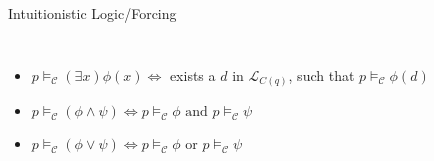 \documentclass{beamer}
\begin{document}
\begin{frame}{Intuitionistic Logic/Forcing}
\begin{columns}
{\begin{itemize}
\item    \textcolor{black!30}{$ p \vDash_{\mathcal{C}} (\exists x) \phi(x)  \Leftrightarrow $  exists a $d$ in  $\mathcal{L}_{C(q)}$, such that $p \vDash_{\mathcal{C}} \phi(d)$}\\

\item    \textcolor{black!30}{$ p \vDash_{\mathcal{C}} (\phi \land \psi)    \Leftrightarrow p \vDash_{\mathcal{C}} \phi \text{ and } p \vDash_{\mathcal{C}} \psi$}\\

\item    \textcolor{black!30}{$ p \vDash_{\mathcal{C}} (\phi \lor \psi)     \Leftrightarrow p \vDash_{\mathcal{C}} \phi$ or $p \vDash_{\mathcal{C}} \psi$}\\


    \end{itemize}
}

    \rule{0.2mm}{\textheight} %

    \forcingExampleiI
    

\end{columns}
\end{frame}
\end{document}
